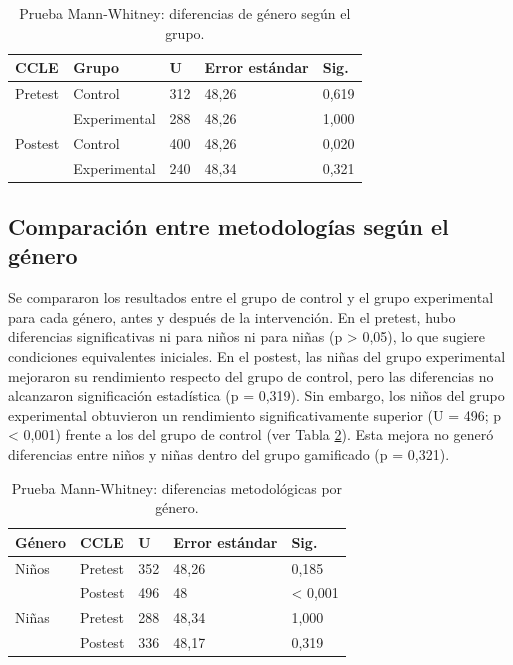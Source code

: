 \documentclass[spanish]{textolivre}
\begin{document}
\begin{table}[htbp]
\centering
\begin{threeparttable}
\caption{Prueba Mann-Whitney: diferencias de género según el grupo.}\label{tab-3}
\begin{tabular}{p{1.5cm}p{2cm}p{1cm}p{2.5cm}p{1cm}}
\toprule
CCLE & Grupo & U & Error estándar & Sig. \\
\midrule
Pretest & Control & 312 & 48,26 & 0,619 \\
& Experimental & 288 & 48,26 & 1,000 \\

\addlinespace

Postest & Control & 400 & 48,26 & 0,020 \\
& Experimental & 240 & 48,34 & 0,321 \\
\bottomrule
\end{tabular}
\end{threeparttable}
\end{table}

\subsection{Comparación entre metodologías según el género}
Se compararon los resultados entre el grupo de control y el grupo experimental para cada género, antes y después de la intervención. En el pretest, hubo diferencias significativas ni para niños ni para niñas (p > 0,05), lo que sugiere condiciones equivalentes iniciales. En el postest, las niñas del grupo experimental mejoraron su rendimiento respecto del grupo de control, pero las diferencias no alcanzaron significación estadística (p = 0,319). Sin embargo, los niños del grupo experimental obtuvieron un rendimiento significativamente superior (U = 496; p < 0,001) frente a los del grupo de control (ver Tabla \ref{tab-4}). Esta mejora no generó diferencias entre niños y niñas dentro del grupo gamificado (p = 0,321).

\begin{table}[h!]
\centering
\begin{threeparttable}
\caption{Prueba Mann-Whitney: diferencias metodológicas por género.}\label{tab-4}
\begin{tabular}{p{1.3cm}p{1.5cm}p{1cm}p{2.5cm}p{1.5cm}}
\toprule
Género & CCLE & U & Error estándar & Sig. \\
\midrule
Niños & Pretest & 352 & 48,26 & 0,185 \\
& Postest & 496 & 48 & < 0,001 \\

\addlinespace

Niñas & Pretest & 288 & 48,34 & 1,000 \\
& Postest & 336 & 48,17 & 0,319 \\
\bottomrule
\end{tabular}
\end{threeparttable}
\end{table}
\end{document}
